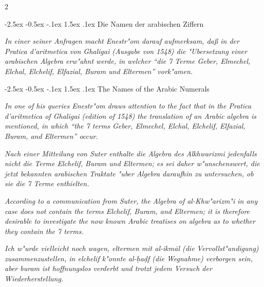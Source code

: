 \documentclass[10pt,a4paper]{article}
\makeatletter
\newcommand{\enquote}[1]{``#1''}
\renewcommand{\section}{\@startsection{section}{1}{\z@}%
  {-2.5ex \@plus -0.5ex \@minus -.1ex}%
  {1.5ex \@plus .1ex}%
  {\normalfont\large\bfseries\color{sectioncolor}}}
\makeatother
\begin{document}
\begin{paracol}{2}

\section{Die Namen der arabischen Ziffern}

\textit{In einer seiner Anfragen macht Enestr"om darauf aufmerksam, da\ss{} in der \textit{Pratica d'aritmetica} von Ghaligai (Ausgabe von 1548) die "Ubersetzung einer arabischen Algebra erw"ahnt werde, in welcher \enquote{die 7 Terme Geber, Elmechel, Elchal, Elchelif, Elfazial, Buram und Eltermen} vork"amen.}

\switchcolumn

\section{The Names of the Arabic Numerals}

\textit{In one of his queries Enestr"om draws attention to the fact that in the \textit{Pratica d'aritmetica} of Ghaligai (edition of 1548) the translation of an Arabic algebra is mentioned, in which \enquote{the 7 terms Geber, Elmechel, Elchal, Elchelif, Elfazial, Buram, and Eltermen} occur.}

\switchcolumn*

\textit{Nach einer Mitteilung von Suter enthalte die Algebra des Alkhwarizmi jedenfalls nicht die Terme Elchelif, Buram und Eltermen; es sei daher w"unschenswert, die jetzt bekannten arabischen Traktate "uber Algebra daraufhin zu untersuchen, ob sie die 7 Terme enthielten.}

\switchcolumn

\textit{According to a communication from Suter, the Algebra of al-Khw"arizm"i in any case does not contain the terms Elchelif, Buram, and Eltermen; it is therefore desirable to investigate the now known Arabic treatises on algebra as to whether they contain the 7 terms.}

\switchcolumn*

\textit{Ich w"urde vielleicht noch wagen, \textit{eltermen} mit \textit{al-ikm\=al} (die Vervollst"andigung) zusammenzustellen, in \textit{elchelif} k"onnte \textit{al-\d{h}a\d{d}f} (die Wegnahme) verborgen sein, aber \textit{buram} ist hoffnungslos verderbt und trotzt jedem Versuch der Wiederherstellung.}


\end{paracol}
\end{document}
